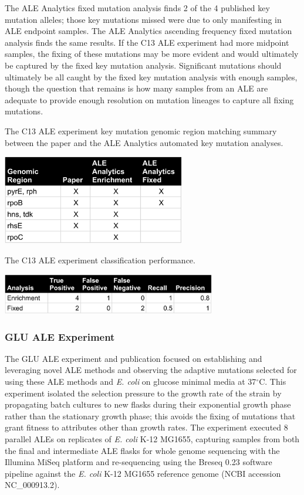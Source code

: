 \documentclass[12pt,final,masters,chapterheads]{ucsd}  %
\begin{document}
The ALE Analytics fixed mutation analysis finds 2 of the 4 published key mutation alleles; those key mutations missed were due to only manifesting in ALE endpoint samples. The ALE Analytics ascending frequency fixed mutation analysis finds the same results. If the C13 ALE experiment had more midpoint samples, the fixing of these mutations may be more evident and would ultimately be captured by the fixed key mutation analysis. Significant mutations should ultimately be all caught by the fixed key mutation analysis with enough samples, though the question that remains is how many samples from an ALE are adequate to provide enough resolution on mutation lineages to capture all fixing mutations.
\begin{table}[H]
  \centering
  \caption{The C13 ALE experiment {key mutation} genomic region matching summary between the paper and the ALE Analytics automated key mutation analyses.}
  \includegraphics[width=0.6\textwidth]{c13_key_mutation_regions.png}
\end{table}
\begin{table}[H]
  \centering
  \caption{The C13 ALE experiment classification performance.}
  \includegraphics[width=0.7\textwidth]{c13_precision_recall.png}
\end{table}
\subsubsection{GLU ALE Experiment}
%
%
The GLU ALE experiment and publication focused on establishing and leveraging novel ALE methods and observing the adaptive mutations selected for using these ALE methods and \textit{E. coli} on glucose minimal media at 37$^{\circ}$C. This experiment isolated the selection pressure to the growth rate of the strain by propagating batch cultures to new flasks during their exponential growth phase rather than the stationary growth phase; this avoids the fixing of mutations that grant fitness to attributes other than growth rates. The experiment executed 8 parallel ALEs on replicates of \textit{E. coli} K-12 MG1655, capturing samples from both the final and intermediate ALE flasks for whole genome sequencing with the Illumina MiSeq platform and re-sequencing using the Breseq 0.23 software pipeline against the \textit{E. coli} K-12 MG1655 reference genome (NCBI accession NC\_000913.2).
\end{document}
